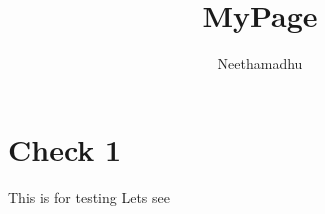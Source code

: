 \documentclass{report}
\title{MyPage}
\author{Neethamadhu}
\begin{document}
\maketitle
\section{Check 1}
This is for testing
Lets see
\end{document}

